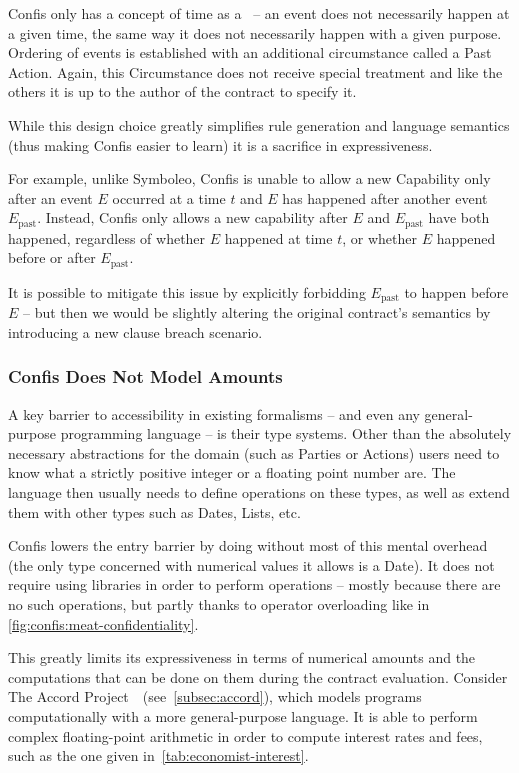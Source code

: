 Confis only has a concept of time as a~ -- an event does not necessarily happen at a given time, the same way it does not necessarily happen with a given purpose.
Ordering of events is established with an additional circumstance called a Past Action.
Again, this Circumstance does not receive special treatment and like the others it is up to the author of the contract to specify it.

While this design choice greatly simplifies rule generation and language semantics (thus making Confis easier to learn) it is a sacrifice in expressiveness.

For example, unlike Symboleo, Confis is unable to allow a new Capability only after an event $E$ occurred at a time $t$ and $E$ has happened after another event $E_{\text{past}}$.
Instead, Confis only allows a new capability after $E$ and $E_{\text{past}}$ have both happened, regardless of whether $E$ happened at time $t$, or whether $E$ happened before or after $E_{\text{past}}$.

It is possible to mitigate this issue by explicitly forbidding $E_{\text{past}}$ to happen before $E$ -- but then we would be slightly altering the original contract's semantics by introducing a new clause breach scenario.

\subsubsection{Confis Does Not Model Amounts}
\label{subsubsec:limits-amounts}

A key barrier to accessibility in existing formalisms -- and even any general-purpose programming language -- is their type systems.
Other than the absolutely necessary abstractions for the domain (such as Parties or Actions) users need to know what a strictly positive integer or a floating point number are.
The language then usually needs to define operations on these types, as well as extend them with other types such as Dates, Lists, etc.

Confis lowers the entry barrier by doing without most of this mental overhead (the only type concerned with numerical values it allows is a Date).
It does not require using libraries in order to perform operations -- mostly because there are no such operations, but partly thanks to operator overloading like in \autoref{fig:confis:meat-confidentiality}.

This greatly limits its expressiveness in terms of numerical amounts and the computations that can be done on them during the contract evaluation.
Consider The Accord Project~\cite{accordHomepage}~(see~\autoref{subsec:accord}), which models programs computationally with a more general-purpose language.
It is able to perform complex floating-point arithmetic in order to compute interest rates and fees, such as the one given in~\autoref{tab:economist-interest}.

